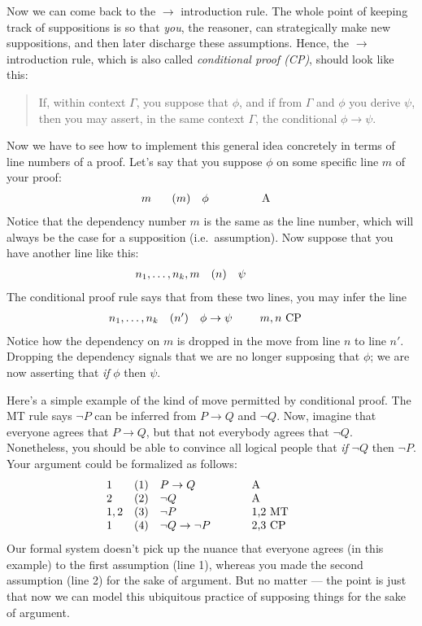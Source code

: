 Now we can come back to the $\to$ introduction rule.  The whole point
of keeping track of suppositions is so that {\it you}, the reasoner,
can strategically make new suppositions, and then later discharge
these assumptions.  Hence, the $\to$ introduction rule, which is also
called \emph{conditional proof (CP)}, should look like this:
\begin{quote} If, within context $\Gamma$, you suppose that $\phi$,
  and if from $\Gamma$ and $\phi$ you derive $\psi$, then you may
  assert, in the same context $\Gamma$, the conditional
  $\phi\to \psi$.  \end{quote} Now we have to see how to implement
this general idea concretely in terms of line numbers of a proof.
Let's say that you suppose $\phi$ on some specific line $m$ of your
proof:
\[ \begin{array}{>{$}p{2cm}<{$} l >{$}p{1.5cm}<{$} p{2cm}}
     \qquad\qquad m & (m) & \phi & A  \end{array} \]
Notice that the dependency number $m$ is the same as the line number,
which will always be the case for a supposition (i.e.\ assumption).
Now suppose that you have another line like this:
\[ \begin{array}{l l >{$}p{1.5cm}<{$} p{2cm}}
    n_1,\dots ,n_k,m & (n) & \psi \end{array} \] The conditional proof
rule says that from these two lines, you may infer the line
\[ \begin{array}{l l
      >{$}p{1.5cm}<{$} p{2cm}} \quad n_1,\dots ,n_k & (n') & \phi\to \psi &
    $m,n$ CP \end{array} \] Notice how the dependency on $m$ is
dropped in the move from line $n$ to line $n'$.  Dropping the
dependency signals that we are no longer supposing that $\phi$; we are
now asserting that {\it if} $\phi$ then $\psi$.

Here's a simple example of the kind of move permitted by conditional
proof.  The MT rule says $\neg P$ can be inferred from $P\to Q$ and
$\neg Q$.  Now, imagine that everyone agrees that $P\to Q$, but that
not everybody agrees that $\neg Q$.  Nonetheless, you should be able
to convince all logical people that {\it if} $\neg Q$ then $\neg P$.
Your argument could be formalized as follows:
\[ \begin{array}{l l >{$}p{2.5cm}<{$} p{2cm}}
     1 & (1) & P\to Q & A \\
     2 & (2) & \neg Q & A \\
     1,2 & (3) & \neg P & 1,2 MT \\
     1 & (4) & \neg Q\to\neg P & 2,3 CP \end{array} \]
Our formal system doesn't pick up the nuance that everyone agrees (in
this example) to the first assumption (line 1), whereas you made the
second assumption (line 2) for the sake of argument.  But no matter
--- the point is just that now we can model this ubiquitous practice
of supposing things for the sake of argument.

